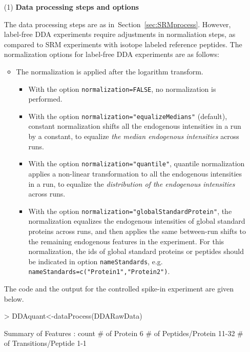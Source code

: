 \documentclass[11pt]{article}
\def\secref#1{Section~\ref{sec:#1}}
\begin{document}
\begin{enumerate}
\item[(1)] {\bf Data processing steps and options} 

The data processing steps are as in~\secref{SRMprocess}. However, label-free DDA experiments require adjustments in normaliation steps, as compared to SRM experiments with isotope labeled reference peptides. The normalization options for label-free DDA experiments are as follows:
\begin{itemize}
\item The normalization is applied after the logarithm transform. 

\begin{itemize}
\item With the option {\tt normalization=FALSE}, no normalization is performed.

\item With the option {\tt normalization="equalizeMedians"} (default), constant normalization shifts all the endogenous intensities in a run by a constant, to equalize {\it the median endogenous intensities} across runs.

\item With the option {\tt normalization="quantile"}, quantile normalization~\citep{Amaratunga:2001ie} applies a non-linear transformation to all the endogenous intensities in a run, to equalize the {\it distribution of the endogenous intensities} across runs. 

\item With the option {\tt normalization="globalStandardProtein"}, the normalization equalizes the endogenous intensities of global standard proteins across runs, and then applies the same between-run shifts to the remaining endogenous features in the experiment. For this normalization, the ids of global standard proteins or peptides should be indicated in option {\tt nameStandards}, e.g. {\tt nameStandards=c("Protein1","Protein2")}.
\end{itemize}
\end{itemize}
The code and the output for the controlled spike-in experiment are given below.
\begin{small}
\begin{Schunk}
\begin{Sinput}
> DDAquant<-dataProcess(DDARawData)
\end{Sinput}
\begin{Soutput}
  Summary of Features :
                         count
# of Protein                 6
# of Peptides/Protein    11-32
# of Transitions/Peptide   1-1
                      

\end{Soutput}
\end{Schunk}
\end{small}
\end{enumerate}
\end{document}
